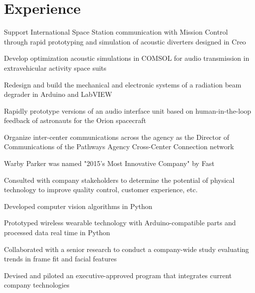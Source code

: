 \documentclass[]{deedy-resume-openfont}
\begin{document}
\begin{minipage}[t]{0.66\textwidth} 


\section{Experience}

\vspace{\topsep} %
\begin{tightemize}
\item Support International Space Station communication with Mission Control through rapid prototyping and simulation of acoustic diverters designed in Creo
\item Develop optimization acoustic simulations in COMSOL for audio transmission in extravehicular activity space suits
\item Redesign and build the mechanical and electronic systems of a radiation beam degrader in Arduino and LabVIEW
\item Rapidly prototype versions of an audio interface unit based on human-in-the-loop feedback of astronauts for the Orion spacecraft
\item Organize inter-center communications across the agency as the Director of Communications of the Pathways Agency Cross-Center Connection network
\end{tightemize}
\sectionsep

\begin{tightemize}
\item Warby Parker was named "2015's Most Innovative Company" by Fast 
\item Consulted with company stakeholders to determine the potential of physical technology to improve quality control, customer experience, etc.
\item Developed computer vision algorithms in Python 
\item Prototyped wireless wearable technology with Arduino-compatible parts and processed data real time in Python
\item Collaborated with a senior research to conduct a company-wide study evaluating trends in frame fit and facial features
\item Devised and piloted an executive-approved program that integrates current company technologies
\end{tightemize}
\sectionsep


\end{minipage}
\end{document}

